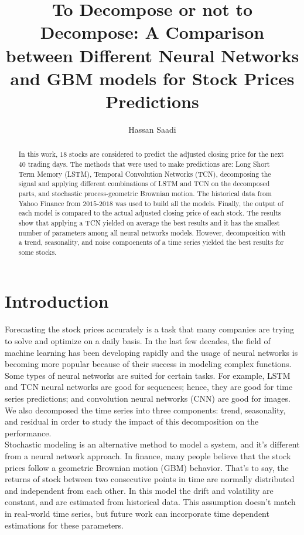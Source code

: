 \documentclass[12pt, A4]{article}
\title{To Decompose or not to Decompose: A Comparison between Different Neural Networks and GBM models for Stock Prices Predictions}
\author{Hassan Saadi}
\begin{document}
	\date{}
	\maketitle
\begin{abstract}
	In this work, $18$ stocks are considered to predict the adjusted closing price for the next $40$ trading days. The methods that were used to make predictions are: Long Short Term Memory (LSTM), Temporal Convolution Networks (TCN), decomposing the signal and applying different combinations of LSTM and TCN on the decomposed parts, and stochastic process-geometric Brownian motion. The historical data from Yahoo Finance from $2015$-$2018$ was used to build all the models. Finally, the output of each model is compared to the actual adjusted closing price of each stock. The results show that applying a TCN yielded on average the best results and it has the smallest number of parameters among all neural networks models. However, decomposition with a trend, seasonality, and noise compoenents of a time series yielded the best results for some stocks. 

\end{abstract}

\section{Introduction}
Forecasting the stock prices accurately is a task that many companies are trying to solve and optimize on a daily basis. In the last few decades, the field of machine learning has been developing rapidly and the usage of neural networks is becoming more popular because of their success in modeling complex functions. Some types of neural networks are suited for certain tasks. For example, LSTM and TCN neural networks are good for sequences; hence, they are good for time series predictions; and convolution neural networks (CNN) are good for images. We also decomposed the time series into three components: trend, seasonality, and residual in order to study the impact of this decomposition on the performance.  \\

Stochastic modeling is an alternative method to model a system, and it's different from a neural network approach. In finance, many people believe that the stock prices follow a geometric Brownian motion (GBM) behavior. That's to say, the returns of stock between two consecutive points in time are normally distributed and independent from each other. In this model the drift and volatility are constant, and are estimated from historical data. This assumption doesn't match in real-world time series, but future work can incorporate time dependent estimations for these parameters.\\
\end{document}
